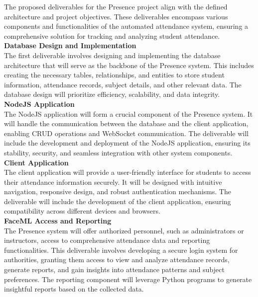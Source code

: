 The proposed deliverables for the Presence project align with the defined architecture and project objectives. These deliverables encompass various components and functionalities of the automated attendance system, ensuring a comprehensive solution for tracking and analyzing student attendance.\\

\textbf{Database Design and Implementation}\\
The first deliverable involves designing and implementing the database architecture that will serve as the backbone of the Presence system. This includes creating the necessary tables, relationships, and entities to store student information, attendance records, subject details, and other relevant data. The database design will prioritize efficiency, scalability, and data integrity.\\

\textbf{NodeJS Application}\\
The NodeJS application will form a crucial component of the Presence system. It will handle the communication between the database and the client application, enabling CRUD operations and WebSocket communication. The deliverable will include the development and deployment of the NodeJS application, ensuring its stability, security, and seamless integration with other system components.\\

\textbf{Client Application}\\
The client application will provide a user-friendly interface for students to access their attendance information securely. It will be designed with intuitive navigation, responsive design, and robust authentication mechanisms. The deliverable will include the development of the client application, ensuring compatibility across different devices and browsers.\\

\textbf{FaceML Access and Reporting}\\
The Presence system will offer authorized personnel, such as administrators or instructors, access to comprehensive attendance data and reporting functionalities. This deliverable involves developing a secure login system for authorities, granting them access to view and analyze attendance records, generate reports, and gain insights into attendance patterns and subject preferences. The reporting component will leverage Python programs to generate insightful reports based on the collected data.